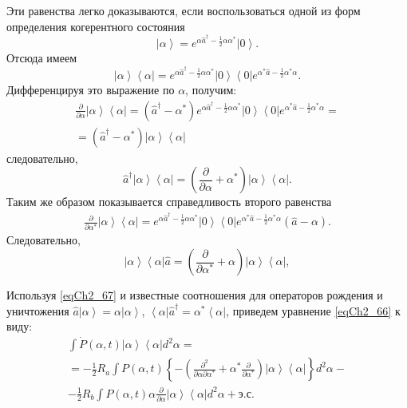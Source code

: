 Эти равенства легко доказываются, если воспользоваться одной из форм
определения когерентного состояния
\[
\left|\alpha\right> = e^{\alpha \hat{a}^{\dag} -
  \frac{1}{2}\alpha\alpha^{*}} \left|0\right>.
\]
Отсюда имеем 
\[
\left|\alpha\right>\left<\alpha\right| = e^{\alpha \hat{a}^{\dag} -
  \frac{1}{2}\alpha\alpha^{*}} \left|0\right>
\left<0\right|e^{\alpha^{*} \hat{a} -
  \frac{1}{2}\alpha^{*}\alpha}.
\]
Дифференцируя это выражение по $\alpha$,  получим:
\begin{eqnarray}
\frac{\partial}{\partial \alpha}\left|\alpha\right>\left<\alpha\right|
= \left(\hat{a}^{\dag} -
\alpha^{*}\right) e^{\alpha \hat{a}^{\dag} -
  \frac{1}{2}\alpha\alpha^{*}} \left|0\right>
\left<0\right|e^{\alpha^{*} \hat{a} -
  \frac{1}{2}\alpha^{*}\alpha} = 
\nonumber \\
= \left(\hat{a}^{\dag} -
\alpha^{*}\right)\left|\alpha\right>\left<\alpha\right| 
\nonumber
\end{eqnarray}
следовательно,
\begin{equation}
\hat{a}^{\dag}\left|\alpha\right>\left<\alpha\right| = 
\left(\frac{\partial}{\partial \alpha} +
\alpha^{*}\right)\left|\alpha\right>\left<\alpha\right|.
\label{eqCh2_68}
\end{equation}
Таким же образом показывается справедливость второго равенства
\begin{eqnarray}
\frac{\partial}{\partial \alpha^{*}}\left|\alpha\right>\left<\alpha\right|
=  e^{\alpha \hat{a}^{\dag} -
  \frac{1}{2}\alpha\alpha^{*}} \left|0\right>
\left<0\right|e^{\alpha^{*} \hat{a} -
  \frac{1}{2}\alpha^{*}\alpha} 
\left(\hat{a} -
\alpha\right). 
\nonumber
\end{eqnarray}
Следовательно,
\begin{equation}
\left|\alpha\right>\left<\alpha\right|\hat{a} = 
\left(\frac{\partial}{\partial \alpha^{*}} +
\alpha\right)\left|\alpha\right>\left<\alpha\right|, 
\label{eqCh2_68a}
\end{equation}

Используя \eqref{eqCh2_67} и известные соотношения для операторов рождения и
уничтожения  $\hat{a}\left|\alpha\right> = \alpha\left|\alpha\right>$,
$\left<\alpha\right|\hat{a}^{\dag} = \alpha^{*}\left<\alpha\right|$,
приведем уравнение \eqref{eqCh2_66} к виду:   
\begin{eqnarray}
\int \dot{P}\left(\alpha,
t\right)\left|\alpha\right>\left<\alpha\right| d^2 \alpha  = 
\nonumber \\
= -\frac{1}{2}R_a\int
P\left(\alpha,t\right)
\left\{
-\left(
\frac{\partial^2}{\partial \alpha \partial \alpha^{*}} +
\alpha^{*}\frac{\partial}{\partial \alpha^{*}}
\right)
\left|\alpha\right>\left<\alpha\right| 
\right\}
d^2 \alpha - 
\nonumber \\
-\frac{1}{2}R_b\int P\left(\alpha,t\right)
\alpha \frac{\partial}{\partial \alpha}
\left|\alpha\right>\left<\alpha\right| 
d^2 \alpha + \mbox{э.с.}
\label{eqCh2_69}
\end{eqnarray}

